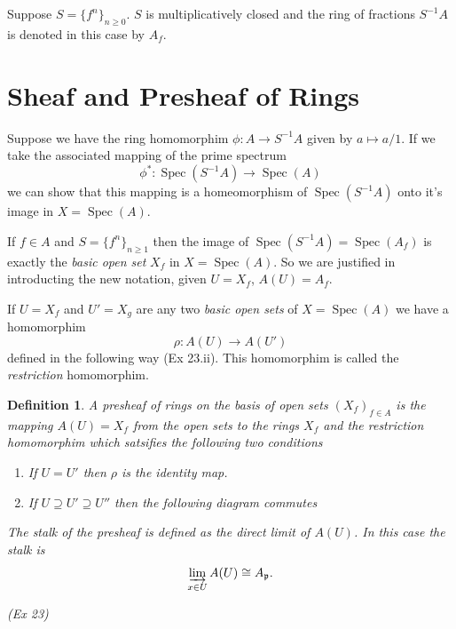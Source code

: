 \documentclass[]{report}
\newtheorem{defn}[theorem]{Definition}
\DeclareMathOperator\Spec{Spec}
\newcommand\byS{S^{-1}}
\newcommand\mfk[1]{\mathfrak{#1}}
\begin{document}
Suppose $S = \{f^n\}_{n\geq 0}$. $S$ is multiplicatively closed and the ring of fractions $\byS A$ is denoted in this case by $A_f$.

\section{Sheaf and Presheaf of Rings}

Suppose we have the ring homomorphim $\phi: A \rightarrow \byS A$ given by $a \mapsto a/1$. If we take the associated mapping of the prime spectrum
    $$\phi^* : \Spec(\byS A) \rightarrow \Spec(A)$$
    we can show that this mapping is a homeomorphism of $\Spec(\byS A)$ onto it's image in $X = \Spec(A)$. 

    If $f \in A$ and $S = \{f^n\}_{n\geq1}$ then the image of $\Spec(\byS A) = \Spec(A_f)$ is exactly the \textit{basic open set} $X_f$ in $X = \Spec(A)$. So we are justified in introducting the new notation, given $U = X_f$, $A(U) = A_f$.

    If $U = X_f$ and $U' = X_g$ are any two \textit{basic open sets} of $X = \Spec(A)$ we have a homomorphim 
    $$\rho: A(U) \rightarrow A(U')$$
    defined in the following way (Ex 23.ii). This homomorphim is called the \textit{restriction} homomorphim.

\begin{defn}
    A \textit{presheaf of rings} on the basis of open sets $(X_f)_{f \in A}$ is the mapping $A(U) = X_f$ from the open sets to the rings $X_f$ and the \textit{restriction} homomorphim which satsifies the following two conditions
    \begin{enumerate}
        \item If $U = U'$ then $\rho$ is the identity map.
        \item If $U \supseteq U' \supseteq U''$ then the following diagram commutes 
            \begin{center}
        \end{center}
    \end{enumerate} 

    The stalk of the presheaf is defined as the direct limit of $A(U)$. In this case the stalk is
    $$\varinjlim_{x \in U} A(U) \cong A_\mfk{p}.$$

    (Ex 23)
\end{defn}
\end{document}

